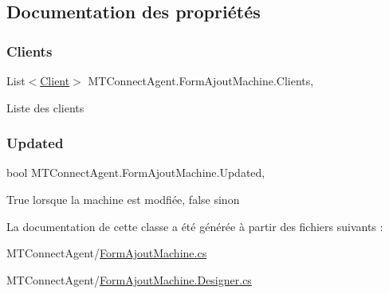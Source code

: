 \subsection{Documentation des propriétés}
\mbox{\label{class_m_t_connect_agent_1_1_form_ajout_machine_a81292c7cbf049dad49be39272b3dedc6}} 
\subsubsection{\texorpdfstring{Clients}{Clients}}
{\footnotesize\ttfamily List$<$\mbox{\hyperlink{class_m_t_connect_agent_1_1_model_1_1_client}{Client}}$>$ M\+T\+Connect\+Agent.\+Form\+Ajout\+Machine.\+Clients\hspace{0.3cm}{\ttfamily [get]}, {\ttfamily [set]}}



Liste des clients 

\mbox{\label{class_m_t_connect_agent_1_1_form_ajout_machine_ab24ec6044e36da1d0b618df5cccd9870}} 
\subsubsection{\texorpdfstring{Updated}{Updated}}
{\footnotesize\ttfamily bool M\+T\+Connect\+Agent.\+Form\+Ajout\+Machine.\+Updated\hspace{0.3cm}{\ttfamily [get]}, {\ttfamily [set]}}



True lorsque la machine est modfiée, false sinon 



La documentation de cette classe a été générée à partir des fichiers suivants \+:\begin{DoxyCompactItemize}
\item 
M\+T\+Connect\+Agent/\mbox{\hyperlink{_form_ajout_machine_8cs}{Form\+Ajout\+Machine.\+cs}}\item 
M\+T\+Connect\+Agent/\mbox{\hyperlink{_form_ajout_machine_8_designer_8cs}{Form\+Ajout\+Machine.\+Designer.\+cs}}\end{DoxyCompactItemize}
